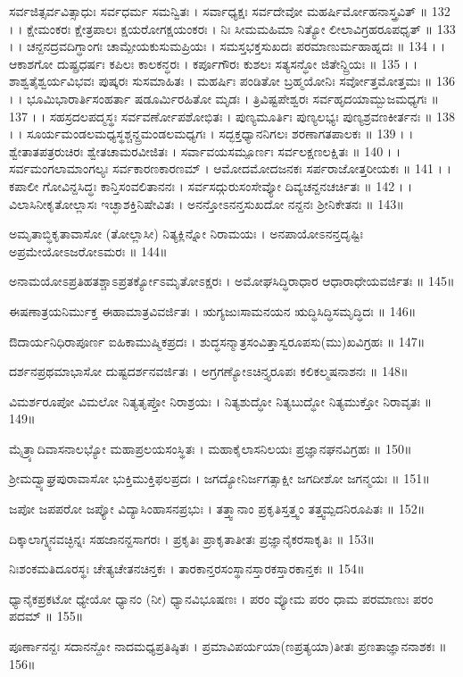 ಸರ್ವಜಿತ್ಸರ್ವವಿತ್ಸಾಧುಃ ಸರ್ವಧರ್ಮ ಸಮನ್ವಿತಃ ।
ಸರ್ವಾಧ್ಯಕ್ಷಃ ಸರ್ವದೇವೋ ಮಹರ್ಷಿರ್ಮೋಹನಾಸ್ತ್ರವಿತ್ ॥ 132 । ।
ಕ್ಷೇಮಂಕರಃ ಕ್ಷೇತ್ರಪಾಲಃ ಕ್ಷಯರೋಗಕ್ಷಯಂಕರಃ ।
ನಿಃ ಸೀಮಮಹಿಮಾ ನಿತ್ಯೋ ಲೀಲಾವಿಗ್ರಹರೂಪಧೃತ್ ॥ 133 । ।
ಚನ್ದನದ್ರವದಿಗ್ಧಾಂಗಃ ಚಾಮ್ಪೇಯಕುಸುಮಪ್ರಿಯಃ ।
ಸಮಸ್ತಭಕ್ತಸುಖದಃ ಪರಮಾಣುರ್ಮಹಾಹ್ನದಃ ॥ 134 । ।
ಆಕಾಶಗೋ ದುಷ್ಪ್ರಧರ್ಷಃ ಕಪಿಲಃ ಕಾಲಕನ್ಧರಃ ।
ಕರ್ಪೂಗೌರಃ ಕುಶಲಃ ಸತ್ಯಸನ್ಧೋ ಜಿತೇನ್ದ್ರಿಯಃ ॥ 135 । ।
ಶಾಶ್ವತೈಶ್ವರ್ಯವಿಭವಃ ಪುಷ್ಕರಃ ಸುಸಮಾಹಿತಃ ।
ಮಹರ್ಷಿಃ ಪಂಡಿತೋ ಬ್ರಹ್ಮಯೋನಿಃ ಸರ್ವೋತ್ತಮೋತ್ತಮಃ ॥ 136 । ।
ಭೂಮಿಭಾರಾರ್ತಿಸಂಹರ್ತಾ ಷಡೂರ್ಮಿರಹಿತೋ ಮೃಡಃ ।
ತ್ರಿವಿಷ್ಟಪೇಶ್ವರಃ ಸರ್ವಹೃದಯಾಮ್ಬುಜಮಧ್ಯಗಃ ॥ 137 । ।
ಸಹಸ್ರದಲಪದ್ಮಸ್ಥಃ ಸರ್ವವರ್ಣೋಪಶೋಭಿತಃ ।
ಪುಣ್ಯಮೂರ್ತಿಃ ಪುಣ್ಯಲಭ್ಯಃ ಪುಣ್ಯಶ್ರವಣಕೀರ್ತನಃ ॥ 138 । ।
ಸೂರ್ಯಮಂಡಲಮಧ್ಯಸ್ಥಶ್ಚನ್ದ್ರಮಂಡಲಮಧ್ಯಗಃ ।
ಸದ್ಭಕ್ತಧ್ಯಾನನಿಗಲಃ ಶರಣಾಗತಪಾಲಕಃ ॥ 139 । ।
ಶ್ವೇತಾತಪತ್ರರುಚಿರಃ ಶ್ವೇತಚಾಮರವೀಜಿತಃ ।
ಸರ್ವಾವಯಸಮ್ಪೂರ್ಣಃ ಸರ್ವಲಕ್ಷಣಲಕ್ಷಿತಃ ॥ 140 । ।
ಸರ್ವಮಂಗಲಾಮಾಂಗಲ್ಯಃ ಸರ್ವಕಾರಣಕಾರಣಮ್ ।
ಆಮೋದಮೋದಜನಕಃ ಸರ್ಪರಾಜೋತ್ತರೀಯಕಃ ॥ 141 । ।
ಕಪಾಲೀ ಗೋವಿನ್ದಸಿದ್ಧಃ ಕಾನ್ತಿಸಂವಲಿತಾನನಃ ।
ಸರ್ವಸದ್ಗುರುಸಂಸೇವ್ಯೋ ದಿವ್ಯಚನ್ದನಚರ್ಚಿತಃ ॥ 142 । ।
ವಿಲಾಸಿನೀಕೃತೋಲ್ಲಾಸಃ ಇಚ್ಛಾಶಕ್ತಿನಿಷೇವಿತಃ ।
ಅನನ್ತೋಽನನ್ತಸುಖದೋ ನನ್ದನಃ ಶ್ರೀನಿಕೇತನಃ ॥ 143॥

ಅಮೃತಾಬ್ಧಿಕೃತಾವಾಸೋ (ತೋಲ್ಲಾಸೀ) ನಿತ್ಯಕ್ಲಿನ್ನೋ ನಿರಾಮಯಃ ।
ಅನಪಾಯೋಽನನ್ತದೃಷ್ಟಿಃ ಅಪ್ರಮೇಯೋಽಜರೋಽಮರಃ ॥ 144॥

ಅನಾಮಯೋಽಪ್ರತಿಹತಶ್ಚಾಽಪ್ರತರ್ಕ್ಯೋಽಮೃತೋಽಕ್ಷರಃ ।
ಅಮೋಘಸಿದ್ಧಿರಾಧಾರ ಆಧಾರಾಧೇಯವರ್ಜಿತಃ ॥ 145॥

ಈಷಣಾತ್ರಯನಿರ್ಮುಕ್ತ ಈಹಾಮಾತ್ರವಿವರ್ಜಿತಃ ।
ಋಗ್ಯಜುಃಸಾಮನಯನ ಋದ್ಧಿಸಿದ್ಧಿಸಮೃದ್ಧಿದಃ ॥ 146॥

ಔದಾರ್ಯನಿಧಿರಾಪೂರ್ಣ ಐಹಿಕಾಮುಷ್ಮಿಕಪ್ರದಃ ।
ಶುದ್ಧಸನ್ಮಾತ್ರಸಂವಿತ್ತಾಸ್ವರೂಪಸು(ಮು)ಖವಿಗ್ರಹಃ ॥ 147॥

ದರ್ಶನಪ್ರಥಮಾಭಾಸೋ ದುಷ್ಟದರ್ಶನವರ್ಜಿತಃ ।
ಅಗ್ರಗಣ್ಯೋಽಚಿನ್ತ್ಯರೂಪಃ ಕಲಿಕಲ್ಮಷನಾಶನಃ ॥ 148॥

ವಿಮರ್ಶರೂಪೋ ವಿಮಲೋ ನಿತ್ಯತೃಪ್ತೋ ನಿರಾಶ್ರಯಃ ।
ನಿತ್ಯಶುದ್ಧೋ ನಿತ್ಯಬುದ್ಧೋ ನಿತ್ಯಮುಕ್ತೋ ನಿರಾವೃತಃ ॥ 149॥

ಮೈತ್ರ್ಯಾದಿವಾಸನಾಲಭ್ಯೋ ಮಹಾಪ್ರಲಯಸಂಸ್ಥಿತಃ ।
ಮಹಾಕೈಲಾಸನಿಲಯಃ ಪ್ರಜ್ಞಾನಘನವಿಗ್ರಹಃ ॥ 150॥

ಶ್ರೀಮದ್ವ್ಯಾಘ್ರಪುರಾವಾಸೋ ಭುಕ್ತಿಮುಕ್ತಿಫಲಪ್ರದಃ ।
ಜಗದ್ಯೋನಿರ್ಜಗತ್ಸಾಕ್ಷೀ ಜಗದೀಶೋ ಜಗನ್ಮಯಃ ॥ 151॥

ಜಪೋ ಜಪಪರೋ ಜಪ್ಯೋ ವಿದ್ಯಾಸಿಂಹಾಸನಪ್ರಭುಃ ।
ತತ್ತ್ವಾನಾಂ ಪ್ರಕೃತಿಸ್ತತ್ತ್ವಂ ತತ್ತ್ವಮ್ಪದನಿರೂಪಿತಃ ॥ 152॥

ದಿಕ್ಕಾಲಾಗ್ನ್ಯನವಚ್ಛಿನ್ನಃ ಸಹಜಾನನ್ದಸಾಗರಃ ।
ಪ್ರಕೃತಿಃ ಪ್ರಾಕೃತಾತೀತಃ ಪ್ರಜ್ಞಾನೈಕರಸಾಕೃತಿಃ ॥ 153॥

ನಿಃಶಂಕಮತಿದೂರಸ್ಥಃ ಚೇತ್ಯಚೇತನಚಿನ್ತಕಃ ।
ತಾರಕಾನ್ತರಸಂಸ್ಥಾನಸ್ತಾರಕಸ್ತಾರಕಾನ್ತಕಃ ॥ 154॥

ಧ್ಯಾನೈಕಪ್ರಕಟೋ ಧ್ಯೇಯೋ ಧ್ಯಾನಂ (ನೀ) ಧ್ಯಾನವಿಭೂಷಣಃ ।
ಪರಂ ವ್ಯೋಮ ಪರಂ ಧಾಮ ಪರಮಾಣುಃ ಪರಂ ಪದಮ್ ॥ 155॥

ಪೂರ್ಣಾನನ್ದಃ ಸದಾನನ್ದೋ ನಾದಮಧ್ಯಪ್ರತಿಷ್ಠಿತಃ ।
ಪ್ರಮಾವಿಪರ್ಯಯಾ(ಣಪ್ರತ್ಯಯಾ)ತೀತಃ ಪ್ರಣತಾಜ್ಞಾನನಾಶಕಃ ॥ 156॥

